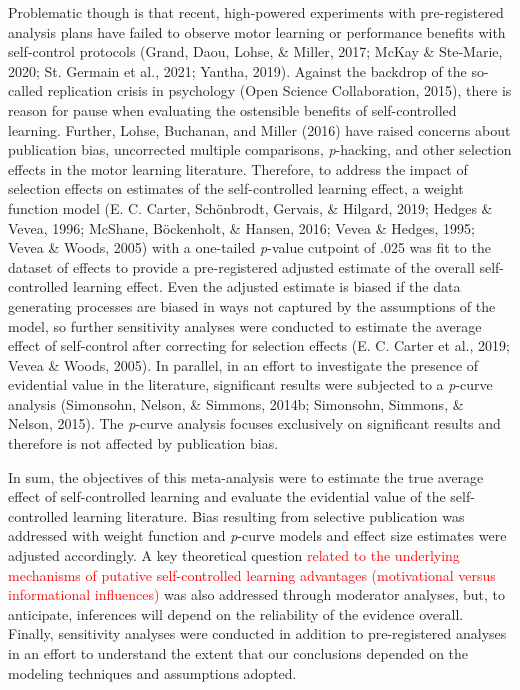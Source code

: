 \documentclass[
  english,
  man,floatsintext]{apa7}
\begin{document}
Problematic though is that recent, high-powered experiments with pre-registered analysis plans have failed to observe motor learning or performance benefits with self-control protocols (Grand, Daou, Lohse, \& Miller, 2017; McKay \& Ste-Marie, 2020; St. Germain et al., 2021; Yantha, 2019). Against the backdrop of the so-called replication crisis in psychology (Open Science Collaboration, 2015), there is reason for pause when evaluating the ostensible benefits of self-controlled learning. Further, Lohse, Buchanan, and Miller (2016) have raised concerns about publication bias, uncorrected multiple comparisons, \emph{p}-hacking, and other selection effects in the motor learning literature. Therefore, to address the impact of selection effects on estimates of the self-controlled learning effect, a weight function model (E. C. Carter, Schönbrodt, Gervais, \& Hilgard, 2019; Hedges \& Vevea, 1996; McShane, Böckenholt, \& Hansen, 2016; Vevea \& Hedges, 1995; Vevea \& Woods, 2005) with a one-tailed \emph{p}-value cutpoint of .025 was fit to the dataset of effects to provide a pre-registered adjusted estimate of the overall self-controlled learning effect. Even the adjusted estimate is biased if the data generating processes are biased in ways not captured by the assumptions of the model, so further sensitivity analyses were conducted to estimate the average effect of self-control after correcting for selection effects (E. C. Carter et al., 2019; Vevea \& Woods, 2005). In parallel, in an effort to investigate the presence of evidential value in the literature, significant results were subjected to a \emph{p}-curve analysis (Simonsohn, Nelson, \& Simmons, 2014b; Simonsohn, Simmons, \& Nelson, 2015). The \emph{p}-curve analysis focuses exclusively on significant results and therefore is not affected by publication bias.

In sum, the objectives of this meta-analysis were to estimate the true average effect of self-controlled learning and evaluate the evidential value of the self-controlled learning literature. Bias resulting from selective publication was addressed with weight function and \emph{p}-curve models and effect size estimates were adjusted accordingly. A key theoretical question \textcolor{red}{related to the underlying mechanisms of putative self-controlled learning advantages (motivational versus informational influences)} was also addressed through moderator analyses, but, to anticipate, inferences will depend on the reliability of the evidence overall. Finally, sensitivity analyses were conducted in addition to pre-registered analyses in an effort to understand the extent that our conclusions depended on the modeling techniques and assumptions adopted.
\end{document}
